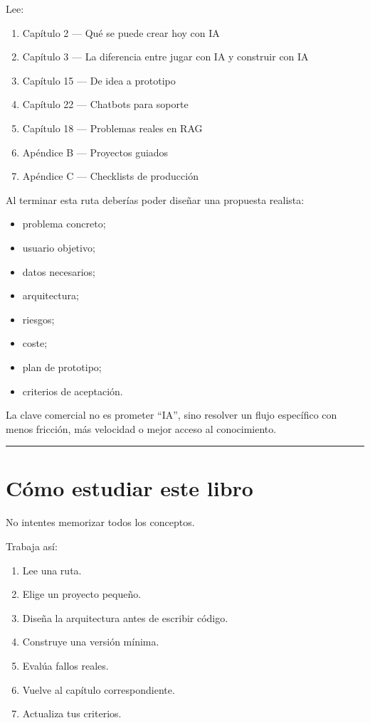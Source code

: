 Lee:

\begin{enumerate}
\def\labelenumi{\arabic{enumi}.}
\tightlist
\item
  Capítulo 2 --- Qué se puede crear hoy con IA
\item
  Capítulo 3 --- La diferencia entre jugar con IA y construir con IA
\item
  Capítulo 15 --- De idea a prototipo
\item
  Capítulo 22 --- Chatbots para soporte
\item
  Capítulo 18 --- Problemas reales en RAG
\item
  Apéndice B --- Proyectos guiados
\item
  Apéndice C --- Checklists de producción
\end{enumerate}

Al terminar esta ruta deberías poder diseñar una propuesta realista:

\begin{itemize}
\tightlist
\item
  problema concreto;
\item
  usuario objetivo;
\item
  datos necesarios;
\item
  arquitectura;
\item
  riesgos;
\item
  coste;
\item
  plan de prototipo;
\item
  criterios de aceptación.
\end{itemize}

La clave comercial no es prometer ``IA'', sino resolver un flujo
específico con menos fricción, más velocidad o mejor acceso al
conocimiento.

\begin{center}\rule{0.5\linewidth}{0.5pt}\end{center}

\section{Cómo estudiar este libro}\label{cuxf3mo-estudiar-este-libro}

No intentes memorizar todos los conceptos.

Trabaja así:

\begin{enumerate}
\def\labelenumi{\arabic{enumi}.}
\tightlist
\item
  Lee una ruta.
\item
  Elige un proyecto pequeño.
\item
  Diseña la arquitectura antes de escribir código.
\item
  Construye una versión mínima.
\item
  Evalúa fallos reales.
\item
  Vuelve al capítulo correspondiente.
\item
  Actualiza tus criterios.
\end{enumerate}

